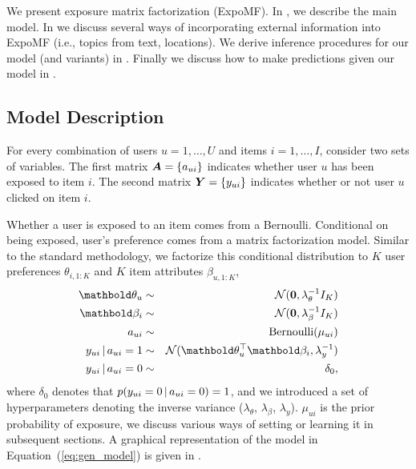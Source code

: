 We present exposure matrix factorization (ExpoMF). 
In , we describe the main model. 
In  we discuss several ways 
of incorporating external information into ExpoMF (i.e., topics from text, locations). 
We derive inference procedures for our model (and variants) in . Finally we discuss how to make predictions given our model in .

\subsection{Model Description}
\label{sec:model_description}

For every combination of users $u=1,\dots,U$ and items $i=1,\dots,I$, consider two sets of variables. The first matrix $\boldsymbol{A} = \left\{ a_{ui} \right\}$ indicates whether user $u$ has been exposed to item $i$. The second matrix $\boldsymbol{Y} = \left\{ y_{ui} \right\}$ indicates whether or not user $u$ clicked on item $i$.

Whether a user is exposed to an item comes from a Bernoulli. Conditional on being exposed, user's preference comes from a matrix factorization model. Similar to the standard methodology, we factorize this conditional distribution to $K$ user preferences $\theta_{i,1:K}$ and $K$ item attributes $\beta_{u,1:K}$,
\begin{eqnarray} %
	\mb\theta_{u} &\sim& \mathcal{N}(\bzero, \lambda_\theta^{-1} I_K) \nonumber \\
	\mb\beta_{i} &\sim& \mathcal{N}(\bzero, \lambda_\beta^{-1} I_K)  \nonumber \\
	a_{ui} &\sim& \mathrm{Bernoulli}(\mu_{ui}) \nonumber \\
	y_{ui} \g a_{ui} = 1 &\sim& \mathcal{N}(\mb\theta_u^\top \mb\beta_i, \lambda_y^{-1}) \nonumber \\
	y_{ui} \g a_{ui} = 0 &\sim& \delta_0,
	\label{eq:gen_model}
 \end{eqnarray}
where $\delta_0$ denotes that $p(y_{ui} = 0 \,\vert\, a_{ui} = 0) = 1$, and we
introduced a set of hyperparameters denoting the inverse variance
($\lambda_\theta$, $\lambda_\beta$, $\lambda_y$). $\mu_{ui}$ is the prior
probability of exposure, we discuss various ways of setting or learning it
in subsequent sections. 
A graphical representation of the model in Equation~(\ref{eq:gen_model}) is given in . 

